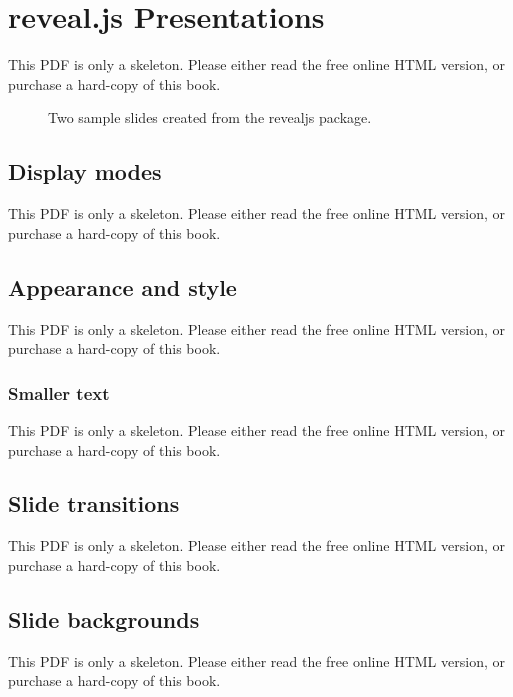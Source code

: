 \documentclass[
  11pt,
]{krantz}
\theoremstyle{definition}
\theoremstyle{definition}
\theoremstyle{definition}
\theoremstyle{definition}
\theoremstyle{remark}
\begin{document}
\chapter{reveal.js Presentations}\label{revealjs}

This PDF is only a skeleton. Please either read the free online HTML version, or purchase a hard-copy of this book.

\begin{figure}\caption{Two sample slides created from the revealjs package.}\end{figure}

\section{Display modes}\label{display-modes-2}

This PDF is only a skeleton. Please either read the free online HTML version, or purchase a hard-copy of this book.

\section{Appearance and style}\label{appearance-and-style-1}

This PDF is only a skeleton. Please either read the free online HTML version, or purchase a hard-copy of this book.

\subsection{Smaller text}\label{smaller-text}

This PDF is only a skeleton. Please either read the free online HTML version, or purchase a hard-copy of this book.

\section{Slide transitions}\label{slide-transitions}

This PDF is only a skeleton. Please either read the free online HTML version, or purchase a hard-copy of this book.

\section{Slide backgrounds}\label{slide-backgrounds}

This PDF is only a skeleton. Please either read the free online HTML version, or purchase a hard-copy of this book.
\end{document}
